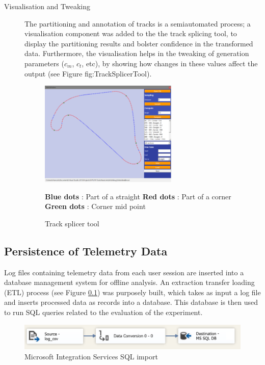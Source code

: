 \begin{description}
	\item [Visualisation and Tweaking] The partitioning and annotation of tracks is a semiautomated process; a visualisation component was added to the the track splicing tool, to display the partitioning results and bolster confidence in the transformed data. Furthermore, the visualisation helps in the tweaking of generation parameters ($c_m$, $c_t$, etc), by showing how changes in these values affect the output (see Figure fig:TrackSplicerTool). 
	
	\begin{figure}[!htb]
		\centering
		\includegraphics[height=5cm]{images/tracksplicertool}
		\caption{Track splicer tool}
		\textbf{Blue dots} : Part of a straight \textbf{Red dots} : Part of a corner \textbf{Green dots} : Corner mid point
		\label{fig:TrackSplicerTool}
	\end{figure}	
\end{description}

\subsection{Persistence of Telemetry Data}
Log files containing telemetry data from each user session are inserted into a database management system for offline analysis. An extraction transfer loading (ETL) process (see Figure \ref{}) was purposely built, which takes as input a log file and inserts processed data as records into a database. This database is then used to run SQL queries related to the evaluation of the experiment.

\begin{figure}[!htb]
	\centering
	\includegraphics[width=\textwidth]{diagrams/ssis.png}
	\caption{Microsoft Integration Services SQL import}
	\label{fig:ssis}
\end{figure}

